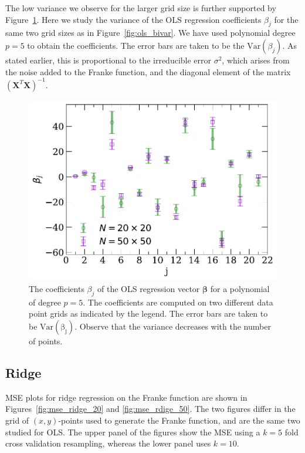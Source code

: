 \documentclass[a4paper, 
amsfonts, 
amssymb, 
amsmath, 
reprint, 
showkeys, 
nofootinbib, 
twoside]{revtex4-2}
\begin{document}
The low variance we observe for the larger grid size is further supported by Figure~\ref{fig:ols_beta}. Here we study the variance of the OLS regression coefficients $\beta_j$ for the same two grid sizes as in Figure~\ref{fig:ols_bivar}. We have used polynomial degree $p = 5$ to obtain the coefficients. The error bars are taken to be the $\mathrm{Var}(\beta_j)$. As stated earlier, this is proportional to the irreducible error $\sigma^2$, which arises from the noise added to the Franke function, and the diagonal element of the matrix $(\mathbf{X}^T\mathbf{X})^{-1}$.  
\begin{figure} [h!]
    \centering
    \includegraphics[width = \columnwidth]{Figures/beta_var.pdf}
    \caption{The coefficients $\beta_j$ of the OLS regression vector $\bm{\beta}$ for a polynomial of degree $p = 5$. The coefficients are computed on two different data point grids as indicated by the legend. The error bars are taken to be $\mathrm{Var(\beta_j)}$. Observe that the variance decreases with the number of points.}
    \label{fig:ols_beta}
\end{figure}

\subsection{Ridge}

MSE plots for ridge regression on the Franke function are shown in Figures~\ref{fig:mse_ridge_20} and \ref{fig:mse_rdige_50}. The two figures differ in the grid of $(x,y)$-points used to generate the Franke function, and are the same two studied for OLS. The upper panel of the figures show the MSE using a $k = 5$ fold cross validation resampling, whereas the lower panel uses $k = 10$.
\end{document}

